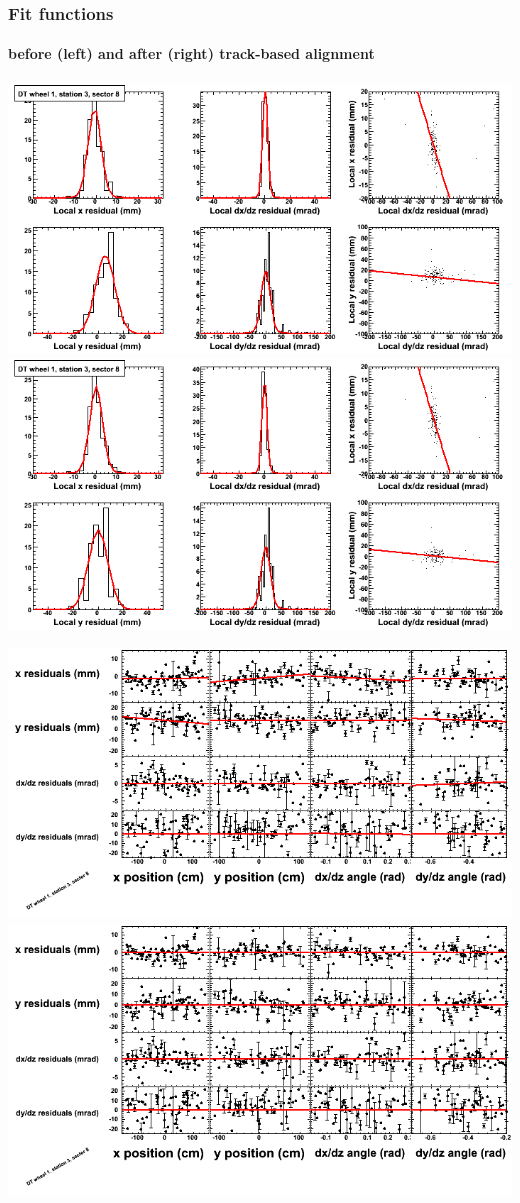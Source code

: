 \documentclass[compress]{beamer}
\begin{document}
\begin{frame}
\frametitle{Fit functions}
\framesubtitle{before (left) and after (right) track-based alignment}
\includegraphics[width=0.5\linewidth]{fitfunctions_re01/MBwhDst3sec08_bellcurves.png} \includegraphics[width=0.5\linewidth]{fitfunctions_re05/MBwhDst3sec08_bellcurves.png}

\includegraphics[width=0.5\linewidth]{fitfunctions_re01/MBwhDst3sec08_polynomials.png} \includegraphics[width=0.5\linewidth]{fitfunctions_re05/MBwhDst3sec08_polynomials.png}
\end{frame}
\end{document}
